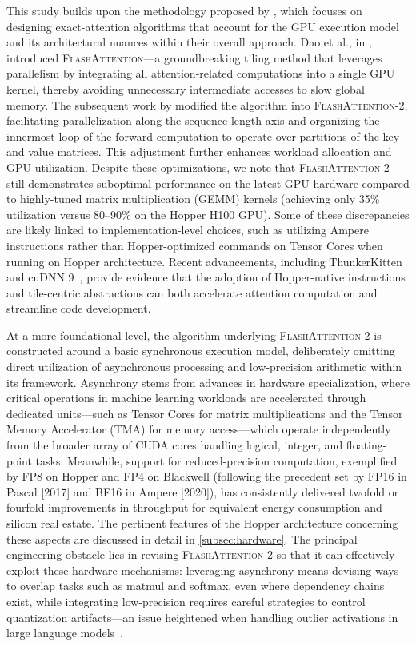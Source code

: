 This study builds upon the methodology proposed by \citet{dao2022flashattention}, which focuses on designing exact-attention algorithms that account for the GPU execution model and its architectural nuances within their overall approach. Dao et al., in \citep{dao2022flashattention}, introduced \textsc{FlashAttention}—a groundbreaking tiling method that leverages parallelism by integrating all attention-related computations into a single GPU kernel, thereby avoiding unnecessary intermediate accesses to slow global memory. The subsequent work by \citet{dao2023flashattention2} modified the algorithm into \textsc{FlashAttention-2}, facilitating parallelization along the sequence length axis and organizing the innermost loop of the forward computation to operate over partitions of the key and value matrices. This adjustment further enhances workload allocation and GPU utilization. Despite these optimizations, we note that \textsc{FlashAttention-2} still demonstrates suboptimal performance on the latest GPU hardware compared to highly-tuned matrix multiplication (GEMM) kernels (achieving only 35\% utilization versus 80–90\% on the Hopper H100 GPU). Some of these discrepancies are likely linked to implementation-level choices, such as utilizing Ampere instructions rather than Hopper-optimized commands on Tensor Cores when running on Hopper architecture. Recent advancements, including ThunkerKitten~\citep{spector2024thunder} and cuDNN 9~\citep{cudnn9}, provide evidence that the adoption of Hopper-native instructions and tile-centric abstractions can both accelerate attention computation and streamline code development.

At a more foundational level, the algorithm underlying \textsc{FlashAttention-2} is constructed around a basic synchronous execution model, deliberately omitting direct utilization of asynchronous processing and low-precision arithmetic within its framework. Asynchrony stems from advances in hardware specialization, where critical operations in machine learning workloads are accelerated through dedicated units—such as Tensor Cores for matrix multiplications and the Tensor Memory Accelerator (TMA) for memory access—which operate independently from the broader array of CUDA cores handling logical, integer, and floating-point tasks. Meanwhile, support for reduced-precision computation, exemplified by FP8 on Hopper and FP4 on Blackwell (following the precedent set by FP16 in Pascal [2017] and BF16 in Ampere [2020]), has consistently delivered twofold or fourfold improvements in throughput for equivalent energy consumption and silicon real estate. The pertinent features of the Hopper architecture concerning these aspects are discussed in detail in \cref{subsec:hardware}. The principal engineering obstacle lies in revising \textsc{FlashAttention-2} so that it can effectively exploit these hardware mechanisms: leveraging asynchrony means devising ways to overlap tasks such as matmul and softmax, even where dependency chains exist, while integrating low-precision requires careful strategies to control quantization artifacts—an issue heightened when handling outlier activations in large language models~\citep{dettmers2208llm, sun2024massive}.

